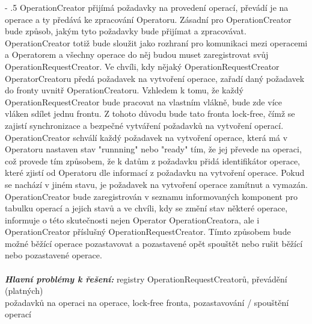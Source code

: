 \documentclass[12pt]{article}
\makeatletter
\newcommand\nodeoc{OperationCreator}
\renewcommand\paragraph{%
    \@startsection{paragraph}{4}{0mm}%
       {-\baselineskip}%
       {.5\baselineskip}%
       {\normalfont\normalsize\bfseries}}
\makeatother
\begin{document}
\paragraph{\nodeoc} 
přijímá požadavky na provedení operací, převádí je na operace a ty předává ke zpracování Operatoru. Zásadní pro OperationCreator bude způsob, jakým tyto požadavky bude přijímat a zpracovávat. OperationCreator totiž bude sloužit jako rozhraní pro komunikaci mezi operacemi a Operatorem a všechny operace do něj budou muset zaregistrovat svůj OperationRequestCreator. Ve chvíli, kdy nějaký OperationRequestCreator OperatorCreatoru předá požadavek na vytvoření operace, zařadí daný požadavek do fronty uvnitř OperationCreatoru. Vzhledem k tomu, že každý OperationRequestCreator bude pracovat na vlastním vlákně, bude zde více vláken sdílet jednu frontu. Z tohoto důvodu bude tato fronta lock-free, čímž se zajistí synchronizace a bezpečné vytváření požadavků na vytvoření operací. OperationCreator schválí každý požadavek na vytvoření operace, která má v Operatoru nastaven stav "runnning" nebo "ready" tím, že jej převede na operaci, což provede tím způsobem, že k datům z požadavku přidá identifikátor operace, které zjistí od Operatoru dle informací z požadavku na vytvoření operace. Pokud se nachází v jiném stavu, je požadavek na vytvoření operace zamítnut a vymazán. OperationCreator bude zaregistrován v seznamu informovaných komponent pro tabulku operací a jejich stavů a ve chvíli, kdy se změní stav některé operace, informuje o této skutečnosti nejen Operator OperationCreatora, ale i OperationCreator příslušný OperationRequestCreator. Tímto způsobem bude možné běžící operace pozastavovat a pozastavené opět spouštět nebo rušit běžící nebo pozastavené operace.\\\\
\textbf{\textit{Hlavní problémy k řešení:}} registry OperationRequestCreatorů, převádění (platných) \\požadavků na operaci na operace, lock-free fronta, pozastavování / spouštění operací
\end{document}
